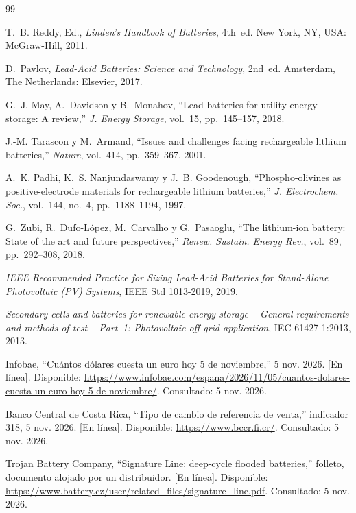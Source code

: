 \documentclass[conference]{IEEEtran}
\begin{document}
\begin{thebibliography}{99}

 T.~B. Reddy, Ed., \emph{Linden's Handbook of Batteries}, 4th~ed. New York, NY, USA: McGraw-Hill, 2011.

 D.~Pavlov, \emph{Lead-Acid Batteries: Science and Technology}, 2nd~ed. Amsterdam, The Netherlands: Elsevier, 2017.

 G.~J. May, A.~Davidson y B.~Monahov, ``Lead batteries for utility energy storage: A review,'' \emph{J. Energy Storage}, vol.~15, pp.~145--157, 2018.

 J.-M. Tarascon y M.~Armand, ``Issues and challenges facing rechargeable lithium batteries,'' \emph{Nature}, vol.~414, pp.~359--367, 2001.

 A.~K. Padhi, K.~S. Nanjundaswamy y J.~B. Goodenough, ``Phospho-olivines as positive-electrode materials for rechargeable lithium batteries,'' \emph{J. Electrochem. Soc.}, vol.~144, no.~4, pp.~1188--1194, 1997.

 G.~Zubi, R.~Dufo-López, M.~Carvalho y G.~Pasaoglu, ``The lithium-ion battery: State of the art and future perspectives,'' \emph{Renew. Sustain. Energy Rev.}, vol.~89, pp.~292--308, 2018.

 \emph{IEEE Recommended Practice for Sizing Lead-Acid Batteries for Stand-Alone Photovoltaic (PV) Systems}, IEEE Std 1013-2019, 2019.

 \emph{Secondary cells and batteries for renewable energy storage -- General requirements and methods of test -- Part~1: Photovoltaic off-grid application}, IEC 61427-1:2013, 2013.

 Infobae, ``Cuántos dólares cuesta un euro hoy 5 de noviembre,'' 5 nov. 2026. [En línea]. Disponible: \url{https://www.infobae.com/espana/2026/11/05/cuantos-dolares-cuesta-un-euro-hoy-5-de-noviembre/}. Consultado: 5 nov. 2026.

 Banco Central de Costa Rica, ``Tipo de cambio de referencia de venta,'' indicador 318, 5 nov. 2026. [En línea]. Disponible: \url{https://www.bccr.fi.cr/}. Consultado: 5 nov. 2026.

 Trojan Battery Company, ``Signature Line: deep-cycle flooded batteries,'' folleto, documento alojado por un distribuidor. [En línea]. Disponible: \url{https://www.battery.cz/user/related_files/signature_line.pdf}. Consultado: 5 nov. 2026.


\end{thebibliography}
\end{document}
